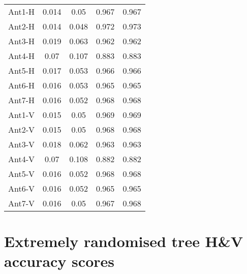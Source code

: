 \begin{table}[H]
\begin{center}
{\begin{tabular}{| c | c | c | c | c |}
Ant1-H&0.014 & 0.05  & 0.967    & 0.967     \\
Ant2-H&0.014 & 0.048 & 0.972    & 0.973     \\
Ant3-H&0.019 & 0.063 & 0.962    & 0.962     \\
Ant4-H&0.07  & 0.107 & 0.883    & 0.883     \\
Ant5-H&0.017 & 0.053 & 0.966    & 0.966     \\
Ant6-H&0.016 & 0.053 & 0.965    & 0.965     \\
Ant7-H&0.016 & 0.052 & 0.968    & 0.968     \\
Ant1-V&0.015 & 0.05  & 0.969    & 0.969     \\
Ant2-V&0.015 & 0.05  & 0.968    & 0.968     \\
Ant3-V&0.018 & 0.062 & 0.963    & 0.963     \\
Ant4-V&0.07  & 0.108 & 0.882    & 0.882     \\
Ant5-V&0.016 & 0.052 & 0.968    & 0.968     \\
Ant6-V&0.016 & 0.052 & 0.965    & 0.965     \\
Ant7-V&0.016 & 0.05  & 0.967    & 0.968     \\ 
 \hline

\end{tabular}}
\end{center}
\end{table}


\section{Extremely randomised tree H\&V accuracy scores}

